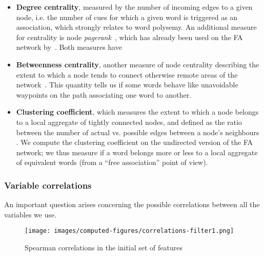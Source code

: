 \begin{itemize}
    \item \textbf{Degree centrality}, measured by the number of incoming edges to a given node, i.e. the number of cues for which a given word is triggered as an association, which strongly relates to word polysemy.
    An additional measure for centrality is node \emph{pagerank}~\citep{Page99}, which has already been used on the FA network by~\citet{Griffiths07}.
    Both measures have 
    \item \textbf{Betweenness centrality}, another measure of node centrality describing the extent to which a node tends to connect otherwise remote areas of the network~\citep{free:set}.
    This quantity tells us if some words behave like unavoidable waypoints on the path associating one word to another.
    \item \textbf{Clustering coefficient}, which measures the extent to which a node belongs to a local aggregate of tightly connected nodes, and defined as the ratio between the number of actual vs. possible edges between a node's neighbours \cite{watt-coll}.
    We compute the clustering coefficient on the undirected version of the FA network; we thus measure if a word belongs more or less to a local aggregate of equivalent words (from a ``free association'' point of view).
\end{itemize}

\subsubsection{Variable correlations}

An important question arises concerning the possible correlations between all the variables we use.

\begin{figure}[!th]
    \centering
    \texttt{[image: images/computed-figures/correlations-filter1.png]}
    \caption{Spearman correlations in the initial set of features}
    \label{fig:feature-corrs-initial}
\end{figure}

